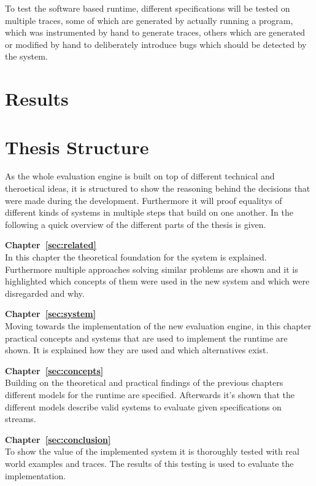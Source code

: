 To test the software based runtime, different specifications will be tested on multiple traces, some of which are generated by actually running a program,
which was instrumented by hand to generate traces, others which are generated or modified by hand to deliberately introduce bugs which should be detected by the system.

\section{Results}
\label{sec:intro:results}


\section{Thesis Structure}
\label{sec:intro:structure}

As the whole evaluation engine is built on top of different technical and theroetical ideas, it is structured to show
the reasoning behind the decisions that were made during the development.
Furthermore it will proof equalitys of different kinds of systems in multiple steps that build on one another.
In the following a quick overview of the different parts of the thesis is given.

\textbf{Chapter~\ref{sec:related}} \\[0.2em]

In this chapter the theoretical foundation for the system is explained.
Furthermore multiple approaches solving similar problems are shown and it is highlighted which concepts of them were
used in the new system and which were disregarded and why.

\textbf{Chapter~\ref{sec:system}} \\[0.2em]

Moving towards the implementation of the new evaluation engine, in this chapter practical concepts and systems that are used to implement the runtime are shown.
It is explained how they are used and which alternatives exist.

\textbf{Chapter~\ref{sec:concepts}} \\[0.2em]

Building on the theoretical and practical findings of the previous chapters different models for the runtime are specified.
Afterwards it's shown that the different models describe valid systems to evaluate given specifications on streams.

\textbf{Chapter~\ref{sec:conclusion}} \\[0.2em]

To show the value of the implemented system it is thoroughly tested with real world examples and traces.
The results of this testing is used to evaluate the implementation.

